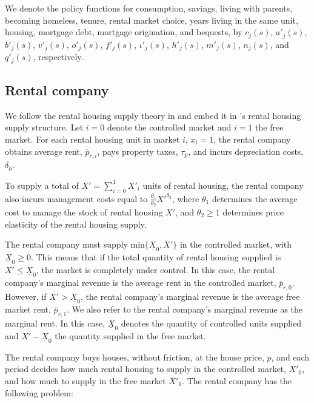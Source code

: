 \documentclass[parskip=full]{article}
\begin{document}
We denote the policy functions for consumption, savings, living with parents, becoming homeless, tenure, rental market choice, years living in the same unit, housing, mortgage debt, mortgage origination, and bequests, by $c_{j}(s)$, $a'_{j}(s)$, $b'_{j}(s)$, $v'_{j}(s)$, $o'_{j}(s)$, $f'_{j}(s)$, $\iota'_{j}(s)$, $h'_{j}(s)$, $m'_{j}(s)$, $n_{j}(s)$, and $q'_j(s)$, respectively.

\subsection{Rental company}\label{sec:rental_company}

We follow the rental housing supply theory in \citet{fallis-1985} and embed it in \citet{garrigaeetal-2009}'s rental housing supply structure. Let $i=0$ denote the controlled market and $i=1$ the free market. For each rental housing unit in market $i$, $x_{i}=1$, the rental company obtains average rent, $\overline{p}_{r,i}$, pays property taxes, $\tau_{p}$, and incurs depreciation costs, $\delta_{h}$. 

To supply a total of $X'=\sum^{1}_{i=0} X'_{i}$ units of rental housing, the rental company also incurs management costs equal to $\frac{\theta_{1}}{\theta_{2}}X'^{\theta_{2}}$, where $\theta_{1}$ determines the average cost to manage the stock of rental housing $X'$, and $\theta_{2}\geq 1$ determines price elasticity of the rental housing supply. 

The rental company must supply $\mbox{min}\{\underline{X}_{0},X'\}$ in the controlled market, with $\underline{X}_{0} \geq 0$. This means that if the total quantity of rental housing supplied is $X'\leq \underline{X}_{0}$, the market is completely under control. In this case, the rental company's marginal revenue is the average rent in the controlled market, $\overline{p}_{r,0}$. However, if $X'>\underline{X}_{0}$, the rental company's marginal revenue is the average free market rent, $\overline{p}_{r,1}$. We also refer to the rental company's marginal revenue as the marginal rent. In this case, $\underline{X}_{0}$ denotes the quantity of controlled units supplied and $X'-\underline{X}_{0}$ the quantity supplied in the free market.

The rental company buys houses, without friction, at the house price, $p$, and each period decides how much rental housing to supply in the controlled market, $X'_{0}$, and how much to supply in the free market $X'_{1}$. The rental company has the following problem:
\end{document}
